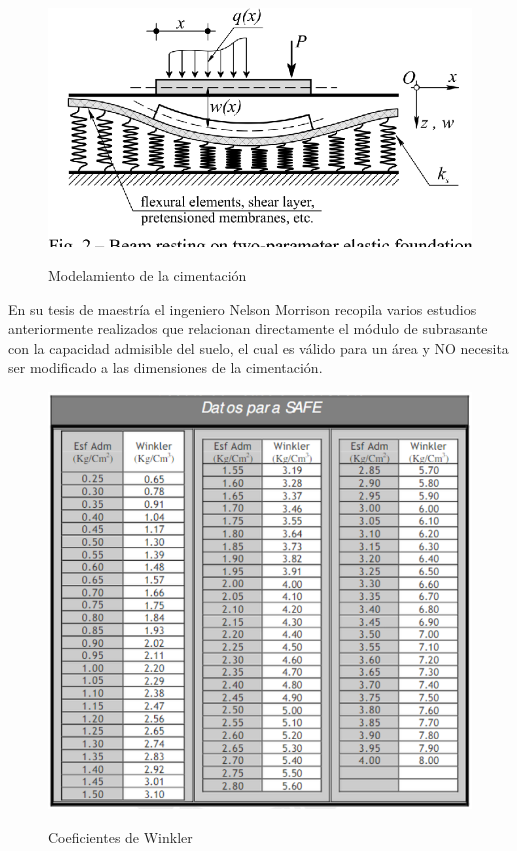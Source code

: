 \begin{figure}[h!]
    \centering
    \caption{Modelamiento de la cimentación}
    \includegraphics[trim={0 0.5cm 0 0},clip,scale=0.6]{idealizacion_cim.png}
    \label{atrans}
\end{figure} 
\newpage
En su tesis de maestría el ingeniero Nelson Morrison recopila varios estudios anteriormente realizados que relacionan directamente el módulo de subrasante con la capacidad admisible del suelo, el cual es válido para un área y NO necesita ser modificado a las dimensiones de la cimentación.

\begin{figure}[h!]
    \centering
    \caption{Coeficientes de Winkler}
    \includegraphics[scale=1]{tabla_winkler.PNG}
    \label{atrans}
\end{figure} 

